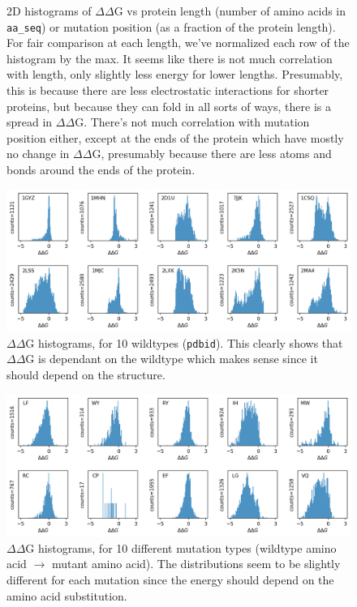 \documentclass{article}
\newcommand{\dd}{$\Delta\Delta$}
\begin{document}
\begin{figure}[!htb]
    \caption{2D histograms of $\Delta\Delta$G vs protein length (number of amino acids in \texttt{aa\_seq}) or mutation position (as a fraction of the protein length). For fair comparison at each length, we've normalized each row of the histogram by the max. It seems like there is not much correlation with length, only slightly less energy for lower lengths. Presumably, this is because there are less electrostatic interactions for shorter proteins, but because they can fold in all sorts of ways, there is a spread in \dd G. There's not much correlation with mutation position either, except at the ends of the protein which have mostly no change in \dd G, presumably because there are less atoms and bonds around the ends of the protein.}
    \label{fig:lenpos}
\end{figure}
\FloatBarrier

\begin{figure}[!htb]
    \centering
    \includegraphics[width=\textwidth]{plots/wildtype.png}
    \caption{$\Delta\Delta$G histograms, for 10 wildtypes (\texttt{pdbid}). This clearly shows that \dd G is dependant on the wildtype which makes sense since it should depend on the structure.}
    \label{fig:wildtype}
\end{figure}
\FloatBarrier

\begin{figure}[!htb]
    \centering
    \includegraphics[width=\textwidth]{plots/mutation.png}
    \caption{$\Delta\Delta$G histograms, for 10 different mutation types (wildtype amino acid $\rightarrow$ mutant amino acid). The distributions seem to be slightly different for each mutation since the energy should depend on the amino acid substitution.}
    \label{fig:mutation}
\end{figure}
\FloatBarrier
\end{document}
